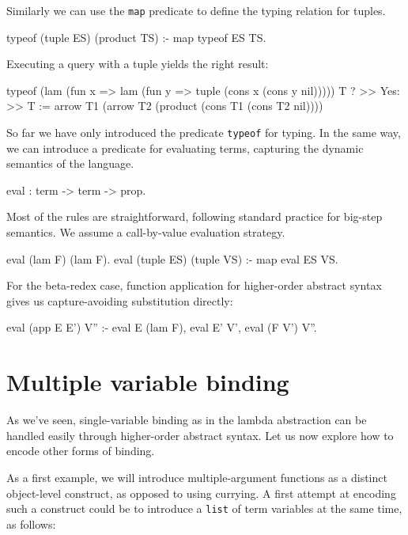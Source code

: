 \documentclass[format=acmlarge,review,anonymous]{acmart}\settopmatter{printfolios=true}
\begin{document}
Similarly we can use the \texttt{map} predicate to define the typing relation for tuples. 

\begin{codequote}
typeof (tuple ES) (product TS) :-
  map typeof ES TS.
\end{codequote}

Executing a query with a tuple yields the right result:

\begin{codequote}
typeof (lam (fun x => lam (fun y => tuple (cons x (cons y nil))))) T ?
>> Yes:
>> T := arrow T1 (arrow T2 (product (cons T1 (cons T2 nil))))
\end{codequote}

So far we have only introduced the predicate \texttt{typeof} for typing. In the same way, we can introduce
a predicate for evaluating terms, capturing the dynamic semantics of the language.

\begin{codequote}
eval : term -> term -> prop.
\end{codequote}

Most of the rules are straightforward, following standard practice for big-step semantics.  We
assume a call-by-value evaluation strategy.

\begin{codequote}
eval (lam F) (lam F).
eval (tuple ES) (tuple VS) :- map eval ES VS.
\end{codequote}

For the beta-redex case, function application for higher-order abstract syntax gives us
capture-avoiding substitution directly:

\begin{codequote}
eval (app E E') V'' :-
  eval E (lam F), eval E' V', eval (F V') V''.
\end{codequote}


\section{Multiple variable binding}

As we've seen, single-variable binding as in the lambda abstraction can
be handled easily through higher-order abstract syntax. Let us now
explore how to encode other forms of binding.

As a first example, we will introduce multiple-argument functions as a
distinct object-level construct, as opposed to using currying. A first
attempt at encoding such a construct could be to introduce a
\texttt{list} of term variables at the same time, as follows:
\end{document}
